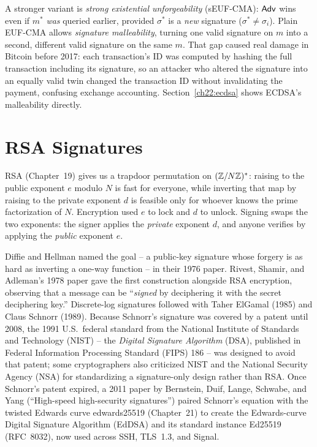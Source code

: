 \begin{trapbox}
A stronger variant is \emph{strong existential unforgeability} (sEUF-CMA): $\mathsf{Adv}$ wins even if $m^*$ \emph{was} queried earlier, provided $\sigma^*$ is a \emph{new} signature ($\sigma^* \neq \sigma_i$). Plain EUF-CMA allows \emph{signature malleability}, turning one valid signature on $m$ into a second, different valid signature on the same $m$. That gap caused real damage in Bitcoin before 2017: each transaction's ID was computed by hashing the full transaction including its signature, so an attacker who altered the signature into an equally valid twin changed the transaction ID without invalidating the payment, confusing exchange accounting. Section~\ref{ch22:ecdsa} shows ECDSA's malleability directly.
\end{trapbox}

\section{RSA Signatures}
\label{ch22:rsa-sig}

RSA (Chapter~19) gives us a trapdoor permutation on $(\mathbb{Z}/N\mathbb{Z})^{*}$: raising to the public exponent $e$ modulo $N$ is fast for everyone, while inverting that map by raising to the private exponent $d$ is feasible only for whoever knows the prime factorization of $N$. Encryption used $e$ to lock and $d$ to unlock. Signing swaps the two exponents: the signer applies the \emph{private} exponent $d$, and anyone verifies by applying the \emph{public} exponent $e$.

\begin{historybox}
Diffie and Hellman named the goal -- a public-key signature whose forgery is as hard as
inverting a one-way function -- in their 1976 paper. Rivest, Shamir, and Adleman's
1978 paper gave the first construction alongside RSA encryption, observing that a message can be
``\emph{signed} by deciphering it with the secret deciphering key.'' Discrete-log
signatures followed with Taher ElGamal (1985) and Claus Schnorr (1989). Because Schnorr's
signature was covered by a patent until 2008, the 1991 U.S.\ federal standard from the
National Institute of Standards and Technology (NIST) -- the \emph{Digital Signature Algorithm}
(DSA), published in Federal Information Processing Standard (FIPS) 186 -- was designed to
avoid that patent; some cryptographers also criticized NIST and the National Security Agency (NSA)
for standardizing a signature-only design rather than RSA. Once
Schnorr's patent expired, a 2011 paper by Bernstein, Duif, Lange, Schwabe, and Yang
(``High-speed high-security signatures'') paired Schnorr's equation with the twisted Edwards curve
edwards25519 (Chapter~21) to create the Edwards-curve Digital Signature Algorithm (EdDSA) and its
standard instance Ed25519 (RFC~8032), now used across SSH, TLS~1.3, and Signal.
\end{historybox}

